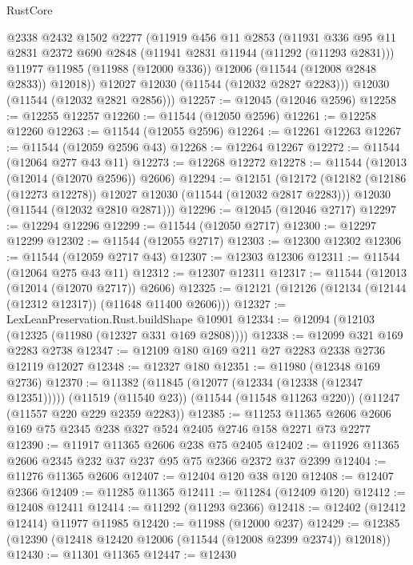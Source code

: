 \begin{lexlean}{RustCore}
\begin{coremodule}
        @2338
        @2432
        @1502
        @2277
        (@11919
          @456
          @11
          @2853
          (@11931
            @336
            @95
            @11
            @2831
            @2372
            @690
            @2848
            (@11941 @2831 @11944 (@11292 (@11293 @2831)))
            @11977
            @11985
            (@11988 (@12000 @336))
            @12006
            (@11544 (@12008 @2848 @2833))
            @12018))
        @12027
        @12030
        (@11544 (@12032 @2827 @2283)))
      @12030
      (@11544 (@12032 @2821 @2856)))
@12257 := @12045 (@12046 @2596)
@12258 := @12255 @12257
@12260 := @11544 (@12050 @2596)
@12261 := @12258 @12260
@12263 := @11544 (@12055 @2596)
@12264 := @12261 @12263
@12267 := @11544 (@12059 @2596 @43)
@12268 := @12264 @12267
@12272 := @11544 (@12064 @277 @43 @11)
@12273 := @12268 @12272
@12278 := @11544 (@12013 (@12014 (@12070 @2596)) @2606)
@12294 := @12151
    (@12172
      (@12182 (@12186 (@12273 @12278)) @12027 @12030 (@11544 (@12032 @2817 @2283)))
      @12030
      (@11544 (@12032 @2810 @2871)))
@12296 := @12045 (@12046 @2717)
@12297 := @12294 @12296
@12299 := @11544 (@12050 @2717)
@12300 := @12297 @12299
@12302 := @11544 (@12055 @2717)
@12303 := @12300 @12302
@12306 := @11544 (@12059 @2717 @43)
@12307 := @12303 @12306
@12311 := @11544 (@12064 @275 @43 @11)
@12312 := @12307 @12311
@12317 := @11544 (@12013 (@12014 (@12070 @2717)) @2606)
@12325 := @12121 (@12126 (@12134 (@12144 (@12312 @12317)) (@11648 @11400 @2606)))
@12327 := LexLeanPreservation.Rust.buildShape @10901
@12334 := @12094 (@12103 (@12325 (@11980 (@12327 @331 @169 @2808))))
@12338 := @12099 @321 @169 @2283 @2738
@12347 := @12109 @180 @169 @211 @27 @2283 @2338 @2736 @12119 @12027
@12348 := @12327 @180
@12351 := @11980 (@12348 @169 @2736)
@12370 := @11382
    (@11845 (@12077 (@12334 (@12338 (@12347 @12351)))))
    (@11519 (@11540 @23))
    (@11544 (@11548 @11263 @220))
    (@11247 (@11557 @220 @229 @2359 @2283))
@12385 := @11253 @11365 @2606 @2606 @169 @75 @2345 @238 @327 @524 @2405 @2746 @158 @2271 @73 @2277
@12390 := @11917 @11365 @2606 @238 @75 @2405
@12402 := @11926 @11365 @2606 @2345 @232 @37 @237 @95 @75 @2366 @2372 @37 @2399
@12404 := @11276 @11365 @2606
@12407 := @12404 @120 @38 @120
@12408 := @12407 @2366
@12409 := @11285 @11365
@12411 := @11284 (@12409 @120)
@12412 := @12408 @12411
@12414 := @11292 (@11293 @2366)
@12418 := @12402 (@12412 @12414) @11977 @11985
@12420 := @11988 (@12000 @237)
@12429 := @12385 (@12390 (@12418 @12420 @12006 (@11544 (@12008 @2399 @2374)) @12018))
@12430 := @11301 @11365
@12447 := @12430

\end{coremodule}
\end{lexlean}
